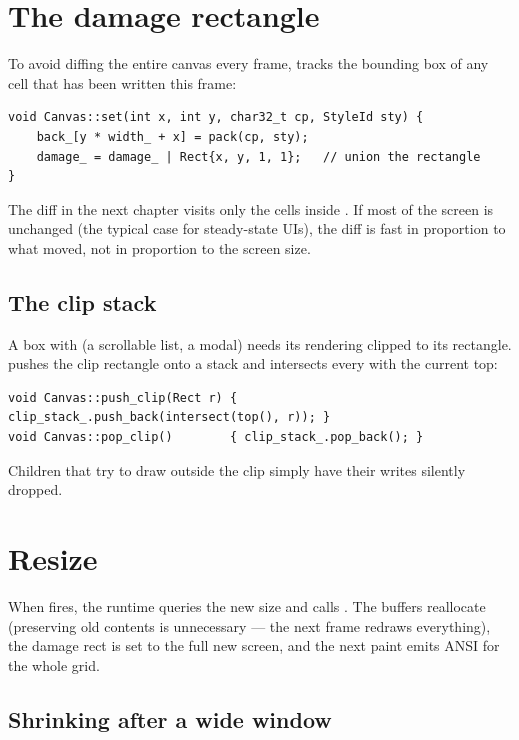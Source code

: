 \section{The damage rectangle}

To avoid diffing the entire canvas every frame, \maya{} tracks the
bounding box of any cell that has been written this frame:

\begin{lstlisting}
void Canvas::set(int x, int y, char32_t cp, StyleId sty) {
    back_[y * width_ + x] = pack(cp, sty);
    damage_ = damage_ | Rect{x, y, 1, 1};   // union the rectangle
}
\end{lstlisting}

The diff in the next chapter visits only the cells inside
. If most of the screen is unchanged (the typical
case for steady-state UIs), the diff is fast in proportion to what
moved, not in proportion to the screen size.

\subsection{The clip stack}

A box with  (a scrollable list, a modal) needs
its rendering clipped to its rectangle. \maya{} pushes the clip
rectangle onto a stack and intersects every  with the
current top:

\begin{lstlisting}
void Canvas::push_clip(Rect r) { clip_stack_.push_back(intersect(top(), r)); }
void Canvas::pop_clip()        { clip_stack_.pop_back(); }
\end{lstlisting}

Children that try to draw outside the clip simply have their writes
silently dropped.

\section{Resize}

When  fires, the runtime queries the new size and
calls . The buffers reallocate (preserving
old contents is unnecessary --- the next frame redraws everything),
the damage rect is set to the full new screen, and the next paint
emits ANSI for the whole grid.

\subsection{Shrinking after a wide window}

